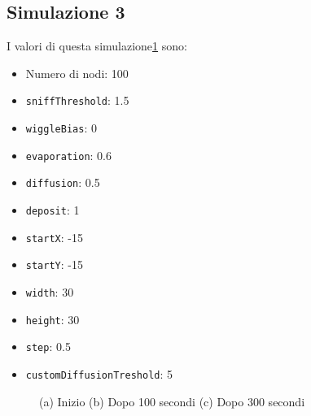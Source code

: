 \subsection{Simulazione 3}\label{sim3}
I valori di questa simulazione\space \cref{fig:sim3} sono:
\begin{itemize}
    \item Numero di nodi: 100
    \item \texttt{sniffThreshold}: 1.5
    \item \texttt{wiggleBias}: 0
    \item \texttt{evaporation}: 0.6
    \item \texttt{diffusion}: 0.5
    \item \texttt{deposit}: 1
    \item \texttt{startX}: -15
    \item \texttt{startY}: -15
    \item \texttt{width}: 30
    \item \texttt{height}: 30
    \item \texttt{step}: 0.5
    \item \texttt{customDiffusionTreshold}: 5
\end{itemize}
\begin{figure}[ht]
    \centering
    \caption{(a) Inizio (b) Dopo 100 secondi (c) Dopo 300 secondi}\label{fig:sim3}
\end{figure}

